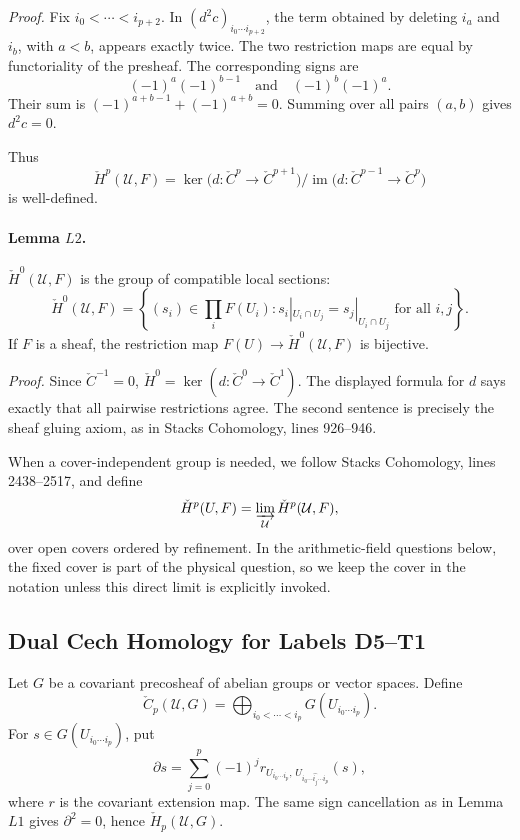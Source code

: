 \emph{Proof.}
Fix \(i_0<\cdots<i_{p+2}\).  In \((d^2c)_{i_0\cdots i_{p+2}}\), the term
obtained by deleting \(i_a\) and \(i_b\), with \(a<b\), appears exactly twice.
The two restriction maps are equal by functoriality of the presheaf.  The
corresponding signs are
\[
  (-1)^a(-1)^{b-1}
  \quad\text{and}\quad
  (-1)^b(-1)^a .
\]
Their sum is \((-1)^{a+b-1}+(-1)^{a+b}=0\).  Summing over all pairs
\((a,b)\) gives \(d^2c=0\).

Thus
\[
  \check H^p(\mathcal U,F)
  =
  \ker\bigl(d:\check C^p\to\check C^{p+1}\bigr)/
  \operatorname{im}\bigl(d:\check C^{p-1}\to\check C^p\bigr)
\]
is well-defined.

\paragraph{Lemma \(L2\).}
\(\check H^0(\mathcal U,F)\) is the group of compatible local sections:
\[
  \check H^0(\mathcal U,F)
  =
  \left\{(s_i)\in\prod_iF(U_i):
  s_i|_{U_i\cap U_j}=s_j|_{U_i\cap U_j}\text{ for all }i,j\right\}.
\]
If \(F\) is a sheaf, the restriction map \(F(U)\to\check H^0(\mathcal U,F)\)
is bijective.

\emph{Proof.}
Since \(\check C^{-1}=0\), \(\check H^0=\ker(d:\check C^0\to\check C^1)\).
The displayed formula for \(d\) says exactly that all pairwise restrictions
agree.  The second sentence is precisely the sheaf gluing axiom, as in
Stacks Cohomology, lines 926--946.

When a cover-independent group is needed, we follow Stacks Cohomology,
lines 2438--2517, and define
\[
  \check H^p(U,F)=
  \varinjlim_{\mathcal U}\check H^p(\mathcal U,F),
\]
over open covers ordered by refinement.  In the arithmetic-field questions
below, the fixed cover is part of the physical question, so we keep the cover
in the notation unless this direct limit is explicitly invoked.

\subsection{Dual Cech Homology for Labels D5--T1}

Let \(G\) be a covariant precosheaf of abelian groups or vector spaces.  Define
\[
  \check C_p(\mathcal U,G)=
  \bigoplus_{i_0<\cdots<i_p}G(U_{i_0\cdots i_p}).
\]
For \(s\in G(U_{i_0\cdots i_p})\), put
\[
  \partial s=
  \sum_{j=0}^p(-1)^j
  r_{U_{i_0\cdots i_p},\,U_{i_0\cdots\widehat{i_j}\cdots i_p}}(s),
\]
where \(r\) is the covariant extension map.  The same sign cancellation as in
Lemma \(L1\) gives \(\partial^2=0\), hence \(\check H_p(\mathcal U,G)\).

